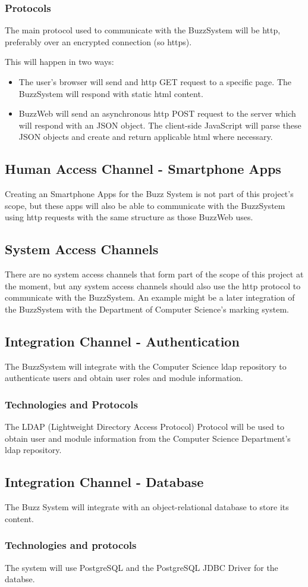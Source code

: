 		
	\subsubsection{Protocols}
	The main protocol used to communicate with the BuzzSystem will be http, preferably over an encrypted connection (so https). 
	
	This will happen in two ways: 
	\begin{itemize}
	\item The user's browser will send and http GET request to a specific page. The BuzzSystem will respond with static html content.
	\item BuzzWeb will send an asynchronous http POST request to the server which will respond with an JSON object. The client-side JavaScript will parse these JSON objects and create and return applicable html where necessary.
	\end{itemize}

\subsection{Human Access Channel - Smartphone Apps}
Creating an Smartphone Apps for the Buzz System is not part of this project's scope, but these apps will also be able to communicate with the BuzzSystem using http requests with the same structure as those BuzzWeb uses.

\subsection{System Access Channels}
There are no system access channels that form part of the scope of this project at the moment, but any system access channels should also use the http protocol to communicate with the BuzzSystem. An example might be a later integration of the BuzzSystem with the Department of Computer Science's marking system.

\subsection{Integration Channel - Authentication}
The BuzzSystem will integrate with the Computer Science ldap repository to authenticate users and obtain user roles and module information. 

\subsubsection{Technologies and Protocols}
The LDAP (Lightweight Directory Access Protocol) Protocol will be used to obtain user and module information from the Computer Science Department's ldap repository. 

\subsection{Integration Channel - Database}
The Buzz System will integrate with an object-relational database to store its content. 

\subsubsection{Technologies and protocols}
The system will use PostgreSQL and the PostgreSQL JDBC Driver for the databse.

